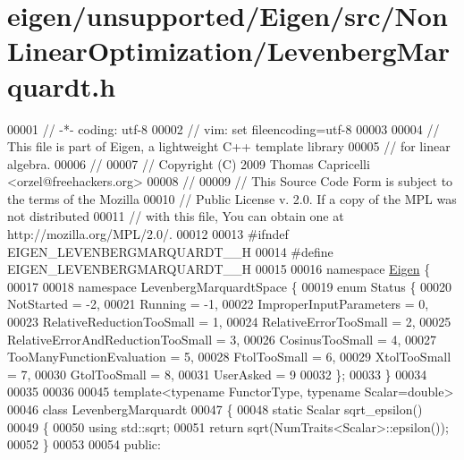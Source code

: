 \hypertarget{eigen_2unsupported_2_eigen_2src_2_non_linear_optimization_2_levenberg_marquardt_8h_source}{}\section{eigen/unsupported/\+Eigen/src/\+Non\+Linear\+Optimization/\+Levenberg\+Marquardt.h}
\label{eigen_2unsupported_2_eigen_2src_2_non_linear_optimization_2_levenberg_marquardt_8h_source}

\begin{DoxyCode}
00001 \textcolor{comment}{// -*- coding: utf-8}
00002 \textcolor{comment}{// vim: set fileencoding=utf-8}
00003 
00004 \textcolor{comment}{// This file is part of Eigen, a lightweight C++ template library}
00005 \textcolor{comment}{// for linear algebra.}
00006 \textcolor{comment}{//}
00007 \textcolor{comment}{// Copyright (C) 2009 Thomas Capricelli <orzel@freehackers.org>}
00008 \textcolor{comment}{//}
00009 \textcolor{comment}{// This Source Code Form is subject to the terms of the Mozilla}
00010 \textcolor{comment}{// Public License v. 2.0. If a copy of the MPL was not distributed}
00011 \textcolor{comment}{// with this file, You can obtain one at http://mozilla.org/MPL/2.0/.}
00012 
00013 \textcolor{preprocessor}{#ifndef EIGEN\_LEVENBERGMARQUARDT\_\_H}
00014 \textcolor{preprocessor}{#define EIGEN\_LEVENBERGMARQUARDT\_\_H}
00015 
00016 \textcolor{keyword}{namespace }\hyperlink{namespace_eigen}{Eigen} \{ 
00017 
00018 \textcolor{keyword}{namespace }LevenbergMarquardtSpace \{
00019     \textcolor{keyword}{enum} Status \{
00020         NotStarted = -2,
00021         Running = -1,
00022         ImproperInputParameters = 0,
00023         RelativeReductionTooSmall = 1,
00024         RelativeErrorTooSmall = 2,
00025         RelativeErrorAndReductionTooSmall = 3,
00026         CosinusTooSmall = 4,
00027         TooManyFunctionEvaluation = 5,
00028         FtolTooSmall = 6,
00029         XtolTooSmall = 7,
00030         GtolTooSmall = 8,
00031         UserAsked = 9
00032     \};
00033 \}
00034 
00035 
00036 
00045 \textcolor{keyword}{template}<\textcolor{keyword}{typename} FunctorType, \textcolor{keyword}{typename} Scalar=\textcolor{keywordtype}{double}>
00046 \textcolor{keyword}{class }LevenbergMarquardt
00047 \{
00048     \textcolor{keyword}{static} Scalar sqrt\_epsilon()
00049     \{
00050       \textcolor{keyword}{using} std::sqrt;
00051       \textcolor{keywordflow}{return} sqrt(NumTraits<Scalar>::epsilon());
00052     \}
00053     
00054 \textcolor{keyword}{public}:

\end{DoxyCode}
